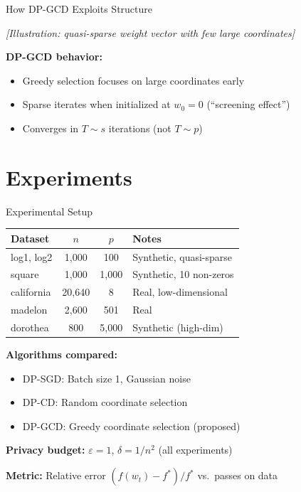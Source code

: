 \documentclass{beamer}
\begin{document}
\begin{frame}{How DP-GCD Exploits Structure}
\begin{center}
\textit{[Illustration: quasi-sparse weight vector with few large coordinates]}
\end{center}

\textbf{DP-GCD behavior:}
\begin{itemize}
\item Greedy selection focuses on large coordinates early
\item Sparse iterates when initialized at $w_0 = 0$ (``screening effect'')
\item Converges in $T \sim s$ iterations (not $T \sim p$)
\end{itemize}
\end{frame}

\section{Experiments}

\begin{frame}{Experimental Setup}
\begin{table}
\begin{tabular}{l|c|c|l}
\textbf{Dataset} & $n$ & $p$ & \textbf{Notes} \\ \hline
log1, log2 & 1,000 & 100 & Synthetic, quasi-sparse \\
square & 1,000 & 1,000 & Synthetic, 10 non-zeros \\
california & 20,640 & 8 & Real, low-dimensional \\
madelon & 2,600 & 501 & Real \\
dorothea & 800 & 5,000 & Synthetic (high-dim) \\
\end{tabular}
\end{table}

\vspace{1em}

\textbf{Algorithms compared:}
\begin{itemize}
\item DP-SGD: Batch size 1, Gaussian noise
\item DP-CD: Random coordinate selection
\item DP-GCD: Greedy coordinate selection (proposed)
\end{itemize}

\vspace{0.5em}

\textbf{Privacy budget:} $\varepsilon = 1$, $\delta = 1/n^2$ (all experiments)

\vspace{0.5em}

\textbf{Metric:} Relative error $(f(w_t) - f^*)/f^*$ vs.\ passes on data
\end{frame}
\end{document}
